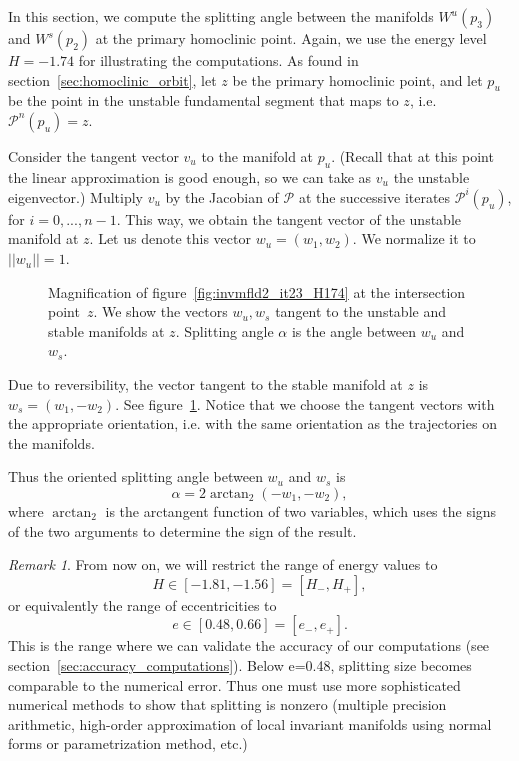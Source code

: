 \documentclass[a4paper]{amsart}
\theoremstyle{remark}
\newtheorem{rem}[thm]{Remark}
\newcommand{\sixmap}{\mathcal{P}}
\begin{document}
In this section, we compute the splitting angle between the manifolds
$W^u(p_3)$ and $W^s(p_2)$ at the primary homoclinic point.
Again, we use the energy level $H=-1.74$ for illustrating the computations.
As found in section~\ref{sec:homoclinic_orbit}, let $z$ be the primary
homoclinic point, and let $p_u$ be the point in the unstable
fundamental segment that maps to $z$, i.e.  $\sixmap^{n}(p_u) = z$.

Consider the tangent vector $v_u$ to the manifold at $p_u$. (Recall
that at this point the linear approximation is good enough, so we can
take as $v_u$ the unstable eigenvector.) 
Multiply $v_u$ by the Jacobian of $\sixmap$ at the successive iterates
$\sixmap^{i}(p_u)$, for $i=0,...,n-1$.
This way, we obtain the tangent vector of the unstable manifold at
$z$. Let us denote this vector $w_u=(w_1,w_2)$. 
We normalize it to $||w_u||=1$.

\begin{figure}
\caption{Magnification of figure~\ref{fig:invmfld2_it23_H174} at the
intersection point~$z$. We show the vectors $w_u, w_s$ tangent to the
unstable and stable manifolds at $z$. Splitting angle $\alpha$ is
the angle between $w_u$ and $w_s$.}
\label{fig:splitangle}
\end{figure}

Due to reversibility, the vector tangent to the stable manifold at $z$
is $w_s=(w_1,-w_2)$. See figure~\ref{fig:splitangle}. Notice that we
choose the tangent vectors with the appropriate orientation, i.e. with
the same orientation as the trajectories on the manifolds. 

Thus the oriented splitting angle between $w_u$ and $w_s$ is 
\[ \alpha = 2\arctan_2(-w_1,-w_2), \]
where $\arctan_2$ is the arctangent function of two variables, which
uses the signs of the two arguments to determine the sign of the
result.

\begin{rem}
From now on, we will restrict the range of energy values to
\[ H\in[-1.81,-1.56]=[H_-,H_+], \]
or equivalently the range of eccentricities to
\[ e\in[0.48,0.66]=[e_-,e_+]. \] 
This is the range where we can validate the accuracy of our
computations (see section~\ref{sec:accuracy_computations}).
Below e=0.48, splitting size becomes comparable to the numerical
error. 
Thus one must use more sophisticated numerical methods to show that
splitting is nonzero (multiple precision arithmetic, high-order
approximation of local invariant manifolds using normal forms or
parametrization method, etc.)
\end{rem}
\end{document}
